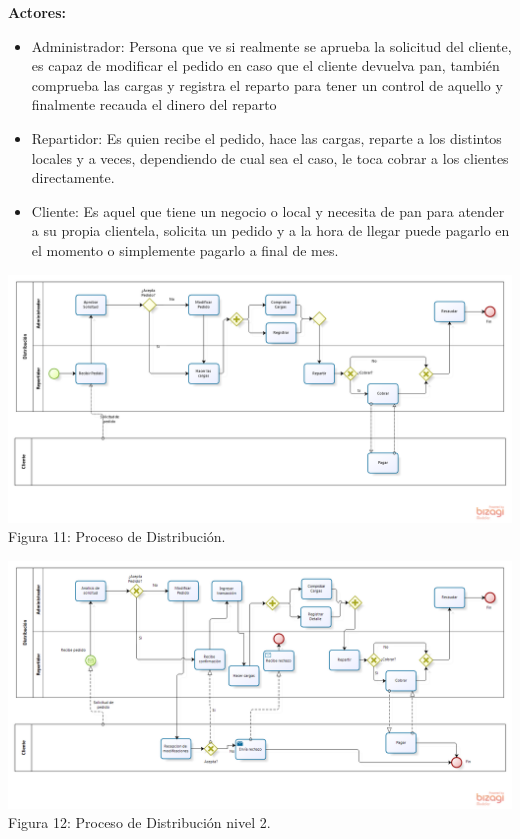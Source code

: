 \begin{itemize}
\textbf{Actores:} 
\begin{itemize}
\item Administrador: Persona que ve si realmente se aprueba la solicitud del cliente, es capaz de modificar el pedido en caso que el cliente devuelva pan, también comprueba las cargas y registra el reparto para tener un control de aquello y finalmente recauda el dinero del reparto
\item Repartidor: Es quien recibe el pedido, hace las cargas, reparte a los distintos locales y a veces, dependiendo de cual sea el caso, le toca cobrar a los clientes directamente.
\item Cliente: Es aquel que tiene un negocio o local y necesita de pan para atender a su propia clientela, solicita un pedido y a la hora de llegar puede pagarlo en el momento o simplemente pagarlo a final de mes.
\end{itemize}

\begin{center}
\includegraphics[width=15cm]{./imagenes/Distribucion.png}\\
Figura 11: Proceso de Distribución.
\end{center}

\begin{center}
\includegraphics[width=15cm]{./imagenes/DistribucionN2.png}\\
Figura 12: Proceso de Distribución nivel 2.
\end{center}


\end{itemize}
